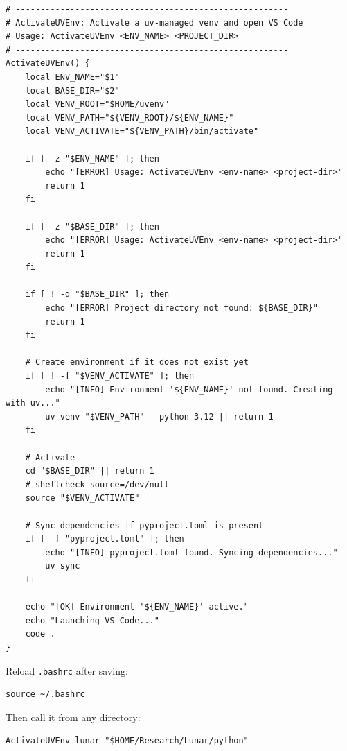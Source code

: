\begin{lstlisting}[style=linuxStyle, basicstyle=\footnotesize\ttfamily, caption={\texttt{ActivateUVEnv()} shell function for \textasciitilde/.bashrc}]
# -------------------------------------------------------
# ActivateUVEnv: Activate a uv-managed venv and open VS Code
# Usage: ActivateUVEnv <ENV_NAME> <PROJECT_DIR>
# -------------------------------------------------------
ActivateUVEnv() {
    local ENV_NAME="$1"
    local BASE_DIR="$2"
    local VENV_ROOT="$HOME/uvenv"
    local VENV_PATH="${VENV_ROOT}/${ENV_NAME}"
    local VENV_ACTIVATE="${VENV_PATH}/bin/activate"

    if [ -z "$ENV_NAME" ]; then
        echo "[ERROR] Usage: ActivateUVEnv <env-name> <project-dir>"
        return 1
    fi

    if [ -z "$BASE_DIR" ]; then
        echo "[ERROR] Usage: ActivateUVEnv <env-name> <project-dir>"
        return 1
    fi

    if [ ! -d "$BASE_DIR" ]; then
        echo "[ERROR] Project directory not found: ${BASE_DIR}"
        return 1
    fi

    # Create environment if it does not exist yet
    if [ ! -f "$VENV_ACTIVATE" ]; then
        echo "[INFO] Environment '${ENV_NAME}' not found. Creating with uv..."
        uv venv "$VENV_PATH" --python 3.12 || return 1
    fi

    # Activate
    cd "$BASE_DIR" || return 1
    # shellcheck source=/dev/null
    source "$VENV_ACTIVATE"

    # Sync dependencies if pyproject.toml is present
    if [ -f "pyproject.toml" ]; then
        echo "[INFO] pyproject.toml found. Syncing dependencies..."
        uv sync
    fi

    echo "[OK] Environment '${ENV_NAME}' active."
    echo "Launching VS Code..."
    code .
}
\end{lstlisting}

Reload \texttt{.bashrc} after saving:

\begin{lstlisting}[style=linuxStyle]
source ~/.bashrc
\end{lstlisting}

Then call it from any directory:

\begin{lstlisting}[style=linuxStyle]
ActivateUVEnv lunar "$HOME/Research/Lunar/python"
\end{lstlisting}

